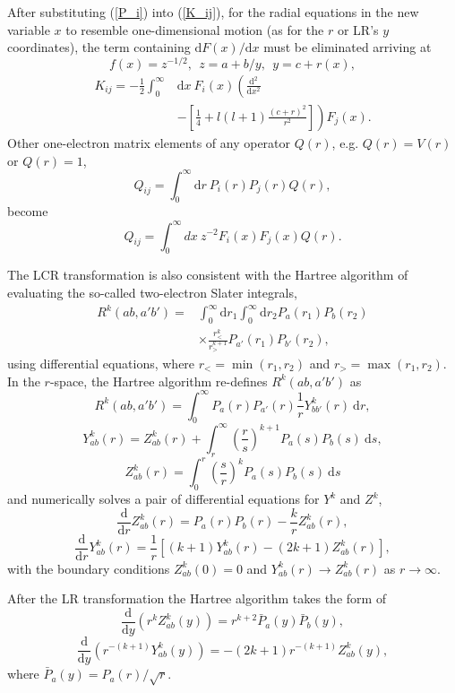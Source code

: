 \documentclass[aip
, pra
, showpacs
, aps
, twocolumn
, groupedaddress
, floatfix
]{revtex4}
\newcommand{\beq}{\begin{equation}}
\newcommand{\eeq}{\end{equation}}
\newcommand{\dd}{\mbox{d}}
\newcommand{\dr}{\mbox{d} r}
\begin{document}
After substituting (\ref{P_i}) into (\ref{K_ij}), for the radial equations in the new variable $x$ to resemble one-dimensional motion (as for the $r$ or LR's $y$ coordinates), the term containing $\mbox{d}F(x)/\mbox{d}x$ must be eliminated arriving at
\beq
f(x) = z^{-1/2}, \ \ z=a+b/y, \ \ y=c+r(x), \label{f_x}
\eeq
\beq
\begin{array}{ll}
K_{ij}=-\frac{1}{2} \int_0^{\infty} & \mbox{d}x \ F_i(x)  \left( \frac{\mbox{d}^2}{\mbox{d}x^2} \right. \\
  & - \left. \left[ \frac{1}{4} + l(l+1) \frac{(c+r)^2}{r^2} \right] \right) F_j(x).
\end{array}
\label{K_ij_LCR}
\eeq
Other one-electron matrix elements of any operator $Q(r)$, e.g. $Q(r)=V(r)$ or $Q(r)=1$,
\beq
Q_{ij}= \int_0^{\infty} \dd r \ P_i(r) P_j(r) Q(r), \label{Q_ij}
\eeq
become
\beq
Q_{ij}= \int_0^{\infty} dx \  z^{-2} F_i(x) F_j(x) Q(r). \label{Q_ij_LCR}
\eeq


The LCR transformation is also consistent with the Hartree algorithm \cite{H57} of evaluating the so-called two-electron Slater integrals,
\beq
\begin{array}{ll}
R^k(a b, a' b')= & \int_0^{\infty} \dr_1 \int_0^{\infty} \dr_2 P_a(r_1) P_b(r_2) \\
 & \times \frac{r^k_{<}}{r^{k+1}_{>}} P_{a'}(r_1) P_{b'}(r_2),
\end{array}
\label{R_k}
\eeq
using differential equations, where $r_{<}=\min(r_1, r_2)$ and $r_{>}=\max(r_1, r_2)$. In the $r$-space, the Hartree algorithm re-defines $R^k(a b, a' b')$ as
\beq
R^k(a b, a' b')= \int_0^{\infty} P_a(r) P_{a'}(r)
 \frac{1}{r} Y^k_{b b'}(r) \ \dr,
\label{R_k_from_Y}
\eeq
\beq
Y^k_{ab}(r) = Z^k_{ab}(r)
+ \int_r^{\infty} \left( \frac{r}{s} \right)^{k+1} P_a(s) P_{b}(s) \ \dd s,
\label{Y_k}
\eeq
\beq
Z^k_{ab}(r) = \int_0^r \left( \frac{s}{r} \right)^k P_a(s) P_{b}(s) \ \dd s
\label{Z_k}
\eeq
and numerically solves a pair of differential equations for $Y^k$ and $Z^k$,
\beq
\frac{\dd}{\dd r} Z^k_{ab}(r) = P_a(r) P_{b}(r) - \frac{k}{r} Z^k_{ab}(r), \label{Z_k_eq} \eeq
\beq
\frac{\dd}{\dd r} Y^k_{ab}(r) = \frac{1}{r} \left[ (k+1) Y^k_{ab}(r) - (2k+1) Z^k_{ab}(r) \right],
\label{Y_k_eq}
\eeq
with the boundary conditions $Z^k_{ab}(0)=0$ and $Y^k_{ab}(r) \rightarrow Z^k_{ab}(r)$ as $r \rightarrow \infty$.


After the LR transformation the Hartree algorithm takes the form \cite{FFBJ97} of
\beq
\frac{\dd}{\dd y} \left( r^k Z^k_{ab}(y) \right) = r^{k+2} \bar{P}_a(y) \bar{P}_{b}(y), \label{Z_k_eq_LR} \eeq
\beq
\frac{\dd}{\dd y} \left( r^{-(k+1)} Y^k_{ab}(y) \right) = -(2k+1)r^{-(k+1)} Z^k_{ab}(y),
\label{Y_k_eq_LR}
\eeq
where $\bar{P}_a(y)=P_a(r)/\sqrt{r}$.
\end{document}
